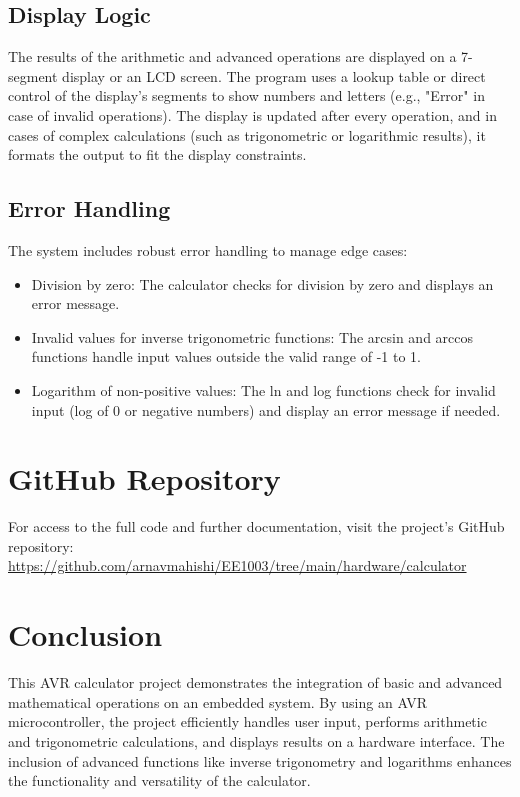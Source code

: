 \documentclass[12pt]{article}
\begin{document}
\subsection{Display Logic}
The results of the arithmetic and advanced operations are displayed on a 7-segment display or an LCD screen. The program uses a lookup table or direct control of the display's segments to show numbers and letters (e.g., "Error" in case of invalid operations). The display is updated after every operation, and in cases of complex calculations (such as trigonometric or logarithmic results), it formats the output to fit the display constraints.

\subsection{Error Handling}
The system includes robust error handling to manage edge cases:
\begin{itemize}
    \item Division by zero: The calculator checks for division by zero and displays an error message.
    \item Invalid values for inverse trigonometric functions: The arcsin and arccos functions handle input values outside the valid range of -1 to 1.
    \item Logarithm of non-positive values: The ln and log functions check for invalid input (log of 0 or negative numbers) and display an error message if needed.
\end{itemize}

\section{GitHub Repository}
For access to the full code and further documentation, visit the project's GitHub repository:
\url{https://github.com/arnavmahishi/EE1003/tree/main/hardware/calculator}


\section{Conclusion}
This AVR calculator project demonstrates the integration of basic and advanced mathematical operations on an embedded system. By using an AVR microcontroller, the project efficiently handles user input, performs arithmetic and trigonometric calculations, and displays results on a hardware interface. The inclusion of advanced functions like inverse trigonometry and logarithms enhances the functionality and versatility of the calculator.
\end{document}
